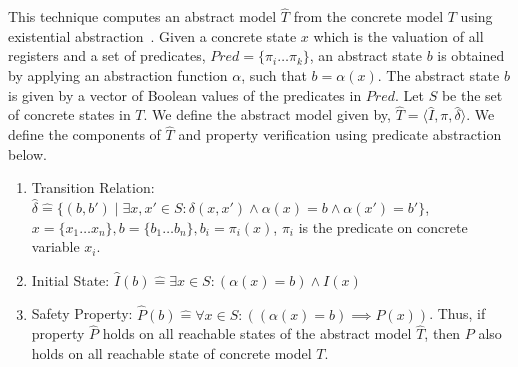 %
This technique computes an abstract model $\hat{T}$ from the concrete model
$T$ using existential abstraction~\cite{cav97,cav2000}. 
%
Given a concrete state $x$ which is the 
valuation of all registers and a set of 
predicates, $Pred=\{\pi_{i} \ldots \pi_{k}\}$, 
an abstract state $b$ is obtained by applying 
an abstraction function $\alpha$, such that $b=\alpha(x)$.  
%
The abstract state $b$ is given by a vector 
of Boolean values of the predicates in $Pred$. 
%
Let $S$ be the set of concrete states in $T$. 
%
We define the abstract model given by, 
$\hat{T} = \langle \hat{I}, \pi, \hat{\delta} \rangle$.  
We define the components of $\hat{T}$ and property 
verification using predicate abstraction below. 
%
\begin{enumerate}
\item Transition Relation: $\hat{\delta} \mathrel{\hat{=}} \{(b,b') \mid \exists x,x' \in S: \delta(x,x') 
\wedge \alpha(x) = b \wedge \alpha(x') = b' \} $, $x=\{x_1 \ldots x_n\}, 
b=\{b_1 \ldots b_n\}, b_i=\pi_{i}(x) $, $\pi_i$ is the predicate on concrete variable $x_i$.

\item Initial State: $\hat{I}(b) \mathrel{\hat{=}} 
\exists x \in S: (\alpha(x) = b) \wedge I(x)$

\item Safety Property: $\hat{P}(b) \mathrel{\hat{=}} 
\forall x \in S: ((\alpha(x) = b) \implies P(x))$.  
Thus, if property $\hat{P}$ holds on all reachable states of the abstract model $\hat{T}$,
then $P$ also holds on all reachable state of concrete model $T$.
\end{enumerate}

